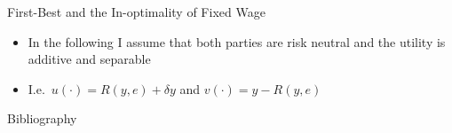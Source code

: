 \documentclass[compress, handout]{beamer}
\begin{document}
\begin{frame}[c]{First-Best and the In-optimality of Fixed Wage}
  \begin{itemize}[<+- | alert@+>]
    \item In the following I assume that both parties are risk neutral and the utility is additive and separable
    \item I.e.\ $u(\cdot)=R(y,e)+\delta y$ and $v(\cdot)=y-R(y,e)$
  \end{itemize}
\end{frame}

\begin{frame}[c]{Bibliography}
\printbibliography%
  
\end{frame}
\end{document}
